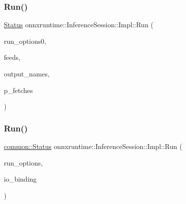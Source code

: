 \subsubsection{\texorpdfstring{Run()}{Run()}\hspace{0.1cm}{\footnotesize\ttfamily [2/4]}}
{\footnotesize\ttfamily \mbox{\hyperlink{classonnxruntime_1_1common_1_1Status}{Status}} onnxruntime\+::\+Inference\+Session\+::\+Impl\+::\+Run (\begin{DoxyParamCaption}\item[{const \mbox{\hyperlink{namespaceonnxruntime_a28ccb3d97f6827bf04d2ce259ff968f1}{Run\+Options}} \&}]{run\+\_\+options0,  }\item[{const \mbox{\hyperlink{namespaceonnxruntime_a48b01f0410ec8d693dbd40d1132bd66c}{Name\+M\+L\+Val\+Map}} \&}]{feeds,  }\item[{const std\+::vector$<$ std\+::string $>$ \&}]{output\+\_\+names,  }\item[{std\+::vector$<$ \mbox{\hyperlink{classonnxruntime_1_1MLValue}{M\+L\+Value}} $>$ $\ast$}]{p\+\_\+fetches }\end{DoxyParamCaption})\hspace{0.3cm}{\ttfamily [inline]}}

\mbox{\label{classonnxruntime_1_1InferenceSession_1_1Impl_a8c0b0a42c5f4ba3a4fa6cffb730bb5f6}} 
\subsubsection{\texorpdfstring{Run()}{Run()}\hspace{0.1cm}{\footnotesize\ttfamily [3/4]}}
{\footnotesize\ttfamily \mbox{\hyperlink{classonnxruntime_1_1common_1_1Status}{common\+::\+Status}} onnxruntime\+::\+Inference\+Session\+::\+Impl\+::\+Run (\begin{DoxyParamCaption}\item[{const \mbox{\hyperlink{namespaceonnxruntime_a28ccb3d97f6827bf04d2ce259ff968f1}{Run\+Options}} \&}]{run\+\_\+options,  }\item[{\mbox{\hyperlink{classonnxruntime_1_1IOBinding}{I\+O\+Binding}} \&}]{io\+\_\+binding }\end{DoxyParamCaption})\hspace{0.3cm}{\ttfamily [inline]}}

